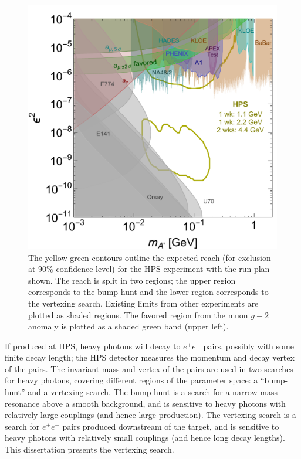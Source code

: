 \begin{figure}[ht]
    \includegraphics[width=\textwidth]{intro/figs/A-visible-HPS-official-6-2015}
    \caption{The yellow-green contours outline the expected reach (for exclusion at 90\% confidence level) for the HPS experiment with the run plan shown.
    The reach is split in two regions; the upper region corresponds to the bump-hunt and the lower region corresponds to the vertexing search.
    Existing limits from other experiments are plotted as shaded regions.
    The favored region from the muon $g-2$ anomaly is plotted as a shaded green band (upper left).}
    \label{fig:reach}
\end{figure}

If produced at HPS, heavy photons will decay to $e^+e^-$ pairs, possibly with some finite decay length; the HPS detector measures the momentum and decay vertex of the pairs.
The invariant mass and vertex of the pairs are used in two searches for heavy photons, covering different regions of the parameter space: a ``bump-hunt'' and a vertexing search.
The bump-hunt is a search for a narrow mass resonance above a smooth background, and is sensitive to heavy photons with relatively large couplings (and hence large production).
The vertexing search is a search for $e^+e^-$ pairs produced downstream of the target, and is sensitive to heavy photons with relatively small couplings (and hence long decay lengths).
This dissertation presents the vertexing search.

